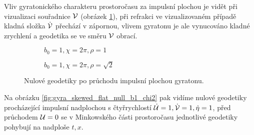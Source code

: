 Vliv gyratonického charakteru prostoročasu za impulsní plochou je vidět při vizualizaci souřadnice $\mathcal{V}$ (obrázek \ref{fig:gyra_flat_null_b1_chi1_2_vxy}),
při refrakci ve vizualizovaném případě kladná složka $\dot{\mathcal{V}}$ přechází v zápornou, vlivem gyratonu je ale vynucováno kladné zrychlení a
geodetika se ve směru $\mathcal{V}$ obrací.

\begin{figure}[ht]
    \centering
    \begin{subfigure}[b]{0.48\textwidth}
        \caption{$b_0=1, \chi=2\pi, \rho=1$}
    \end{subfigure}
    \begin{subfigure}[b]{0.48\textwidth}
        \caption{$b_0=1, \chi=2\pi, \rho=\sqrt{2}$} 
    \end{subfigure}
    \caption{Nulové geodetiky po průchodu impulsní plochou gyratonu.}
    \label{fig:gyra_flat_null_b1_chi1_2_vxy}
\end{figure}

Na obrázku \ref{fig:gyra_skewed_flat_null_b1_chi2} pak vidíme nulové geodetiky procházející impulsní nadplochou
s čtyřrychlostí $\dot{\mathcal{U}} = 1, \dot{\mathcal{V}} = 1, \dot{\eta} = 1$, před průchodem $\mathcal{U}=0$ se v Minkowského části
prostoročasu jednotlivé geodetiky pohybují na nadploše $t, x$.

